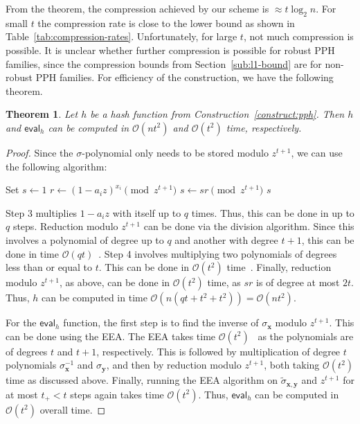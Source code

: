 \documentclass[pdflatex,sn-mathphys-num]{sn-jnl}
\newtheorem{theorem}{Theorem}
\theoremstyle{definition}
\newcommand{\vtr}[1]{\mathbf{#1}}
\begin{document}
From the theorem, the compression achieved by our scheme is $\approx t \log_2 n$. For small $t$ the compression rate is close to the lower bound as shown in Table~\ref{tab:compression-rates}. Unfortunately, for large $t$, not much compression is possible. It is unclear whether further compression is possible for robust PPH families, since the compression bounds from Section~\ref{sub:l1-bound} are for non-robust PPH families. For efficiency of the construction, we have the following theorem.
\begin{theorem}
\label{theo:pph-is-efficient}
Let $h$ be a hash function from Construction~\ref{construct:pph}. Then $h$ and $\mathsf{eval}_h$ can be computed in $\mathcal{O}(nt^2)$ and $\mathcal{O}(t^2)$ time, respectively. 
\end{theorem}
\begin{proof}
Since the $\sigma$-polynomial only needs to be stored modulo $z^{t+1}$, we can use the following algorithm: 

\LinesNumbered
\begin{algorithm}
\DontPrintSemicolon
Set $s \leftarrow 1$\;
{
    $r \leftarrow (1 - a_i z)^{x_i} \pmod{z^{t+1}}$\;
    $s \leftarrow sr \pmod{z^{t+1}}$\;
}
\Return $s$\;
\end{algorithm}

Step 3 multiplies $1 - a_iz$ with itself up to $q$ times. Thus, this can be done in up to $q$ steps. Reduction modulo $z^{t+1}$ can be done via the division algorithm. Since this involves a polynomial of degree up to $q$ and another with degree $t+1$, this can be done in time $\mathcal{O}(qt)$~\cite[\S 17.1]{shoup-nt-book}. Step 4 involves multiplying two polynomials of degrees less than or equal to $t$. This can be done in $\mathcal{O}(t^2)$ time~\cite[\S 17.1]{shoup-nt-book}. Finally, reduction modulo $z^{t+1}$, as above, can be done in $\mathcal{O}(t^2)$ time, as $sr$ is of degree at most $2t$. Thus, $h$ can be computed in time $\mathcal{O}(n(qt + t^2 + t^2)) = \mathcal{O}(n t^2)$.

For the $\mathsf{eval}_h$ function, the first step is to find the inverse of $\sigma_{\vtr{x}}$ modulo $z^{t+1}$. This can be done using the EEA. The EEA takes time $\mathcal{O}(t^2)$~\cite[\S 17.3]{shoup-nt-book} as the polynomials are of degrees $t$ and $t+1$, respectively. This is followed by multiplication of degree $t$ polynomials $\sigma^{-1}_{\vtr{x}}$ and $\sigma_{\vtr{y}}$, and then by reduction modulo $z^{t+1}$, both taking $\mathcal{O}(t^2)$ time as discussed above. Finally, running the EEA algorithm on $\tilde{\sigma}_{\vtr{x}, \vtr{y}}$ and $z^{t+1}$ for at most $t_+ < t$ steps again takes time $\mathcal{O}(t^2)$. Thus, $\mathsf{eval}_h$ can be computed in $\mathcal{O}(t^2)$ overall time. 
\end{proof}
\end{document}
